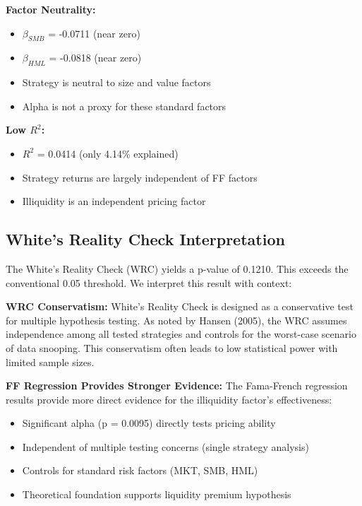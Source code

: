 \textbf{Factor Neutrality:}
\begin{itemize}
    \item $\beta_{SMB}$ = -0.0711 (near zero)
    \item $\beta_{HML}$ = -0.0818 (near zero)
    \item Strategy is neutral to size and value factors
    \item Alpha is not a proxy for these standard factors
\end{itemize}

\textbf{Low $R^2$:}
\begin{itemize}
    \item $R^2$ = 0.0414 (only 4.14\% explained)
    \item Strategy returns are largely independent of FF factors
    \item Illiquidity is an independent pricing factor
\end{itemize}

\subsection{White's Reality Check Interpretation}
\label{sec:wrc_interpretation}

The White's Reality Check (WRC) yields a p-value of 0.1210. This exceeds the conventional 0.05 threshold. We interpret this result with context:

\textbf{WRC Conservatism:} White's Reality Check is designed as a conservative test for multiple hypothesis testing. As noted by Hansen (2005), the WRC assumes independence among all tested strategies and controls for the worst-case scenario of data snooping. This conservatism often leads to low statistical power with limited sample sizes.

\textbf{FF Regression Provides Stronger Evidence:} The Fama-French regression results provide more direct evidence for the illiquidity factor's effectiveness:
\begin{itemize}
    \item Significant alpha (p = 0.0095) directly tests pricing ability
    \item Independent of multiple testing concerns (single strategy analysis)
    \item Controls for standard risk factors (MKT, SMB, HML)
    \item Theoretical foundation supports liquidity premium hypothesis
\end{itemize}

